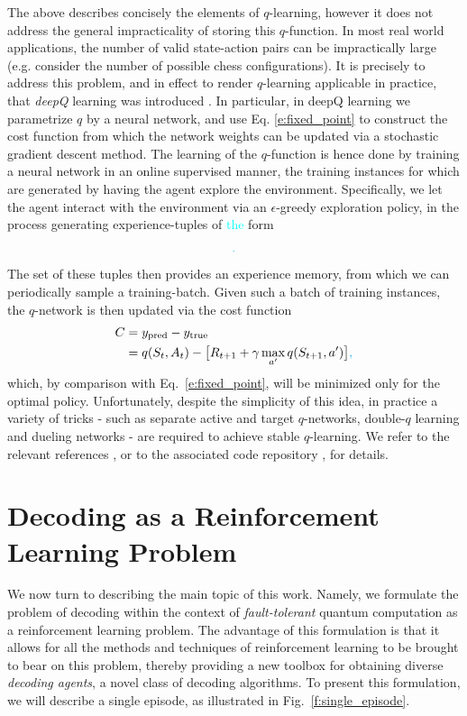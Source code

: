 \documentclass[twocolumn,preprintnumbers,amsmath,amssymb,notitlepage,nofootinbib,longbibliography,superscriptaddress,aps,pra,10pt]{revtex4-1}
\newcommand{\je}[1]{\textcolor{cyan}{#1}}
\begin{document}
	The above describes concisely the elements of $q$-learning, however it does not address the general impracticality of storing this $q$-function.
	In most real world applications, the number of valid state-action pairs can be impractically large (e.g. consider the number of possible chess configurations).
	It is precisely to address this problem, and in effect to render $q$-learning applicable in practice, that \textit{deepQ} learning was introduced \cite{RLMnih15,RLvan2016deep,RLschaul2015prioritized}.
	In particular, in deepQ learning we parametrize $q$ by a neural network, and use Eq. \eqref{e:fixed_point} to construct the cost function from which the network weights can be updated via a stochastic gradient descent method.
	The learning of the $q$-function is hence done by training a neural network in an online supervised manner, the training instances for which are generated by having the agent explore the environment.
	Specifically, we let the agent interact with the environment via an $\epsilon$-greedy exploration policy, in the process generating experience-tuples of \je{the} 
	form
	\begin{equation}
		[S_t,A_t,R_{t+1},S_{t+1}]\je{.}
	\end{equation}
	The set of these tuples then provides an experience memory, from which we can periodically sample a training-batch.
	Given such a batch of training instances, the $q$-network is then updated via the cost function
	\begin{align} 
		C &= y_{\mathrm{pred}} - y_{\mathrm{true}}\\
		&= q(S_t,A_t) - \big[R_{t+1} + \gamma\max_{a'}q(S_{t+1},a') \big]\je{,}
	\end{align}
	which, by comparison with Eq.~\eqref{e:fixed_point}, will be minimized only for the optimal policy.
	Unfortunately, despite the simplicity of this idea, in practice a variety of tricks - such as separate active and target $q$-networks, double-$q$ learning and dueling networks - are required to achieve stable $q$-learning.
	We refer to the relevant references \cite{RLMnih15,RLvan2016deep,RLschaul2015prioritized,RLwang2015dueling}, or to the associated code repository \cite{DeepQDecoding}, for details.

\section{Decoding as a Reinforcement Learning Problem}\label{s:decoding_as_rl}

	We now turn to describing the main topic of this work. 
	Namely, we formulate the problem of decoding within the context of \emph{fault-tolerant} quantum computation as a reinforcement learning problem.
	The advantage of this formulation is that it allows for all the methods and techniques of reinforcement learning to be brought to bear on this problem, thereby providing a new toolbox for obtaining diverse \emph{decoding agents}, a novel class of decoding algorithms.
	To present this formulation, we will describe a single episode, as illustrated in Fig.\ \ref{f:single_episode}.
\end{document}
